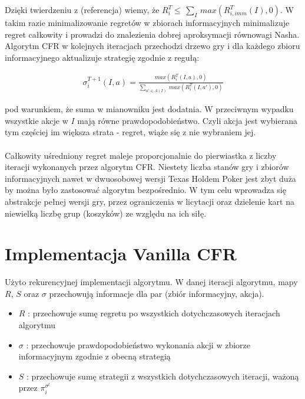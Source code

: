 \documentclass[licencjacka]{pracamgr}
\begin{document}
\noindent
Dzięki twierdzeniu z (referencja) wiemy, że $R_i^T \leq \, \sum_{I} \, max(R_{i, imm}^T(I), 0)$. W takim razie
minimalizowanie regretów w zbiorach informacyjnych minimalizuje regret całkowity i prowadzi do znalezienia
dobrej aproksymacji równowagi Nasha. \\

\noindent
Algorytm CFR w kolejnych iteracjach przechodzi drzewo gry i dla każdego zbioru informacyjnego aktualizuje strategię
zgodnie z regułą:

\begin{align*}
\sigma_i^{T+1} (I, a) = \frac{max(R_i^T(I, a), 0)}{\sum\limits_{a' \in A(I)} \, max(R_i^T(I, a'), 0)}
\end{align*}

\noindent
pod warunkiem, że suma w mianowniku jest dodatnia. W przeciwnym wypadku wszystkie akcje w $I$ mają równe prawdopodobieństwo.
Czyli akcja jest wybierana tym częściej im większa strata - regret, wiąże się z nie wybraniem jej.\\\\

\noindent
Całkowity uśredniony regret maleje proporcjonalnie do pierwiastka z liczby iteracji wykonanych przez algorytm CFR. Niestety
liczba stanów gry i zbiorów informacyjnych nawet w dwuosobowej wersji Texas Holdem Poker jest zbyt duża by można było
zastosować algorytm bezpośrednio. W tym celu wprowadza się abstrakcje pełnej wersji gry, przez ograniczenia w licytacji
oraz dzielenie kart na niewielką liczbę grup (koszyków) ze względu na ich siłę. \\

\section{Implementacja Vanilla CFR}

Użyto rekurencyjnej implementacji algorytmu. W danej iteracji algorytmu, mapy $R$, $S$ oraz $\sigma$ przechowują informacje
dla par (zbiór informacyjny, akcja).
\begin{itemize}
\item $R$ : przechowuje sumę regretu po wszystkich dotychczasowych iteracjach algorytmu
\item $\sigma$ : przechowuje prawdopodobieństwo wykonania akcji w zbiorze informacyjnym zgodnie z obecną strategią
\item $S$ : przechowuje sumę strategii z wszystkich dotychczasowych iteracji, ważoną przez $\pi_i^{\sigma^t}$
\end{itemize}
\end{document}
